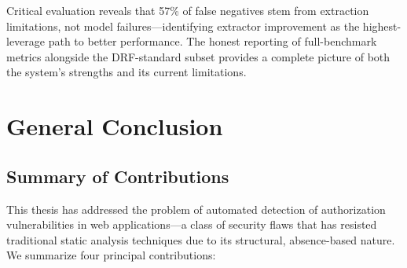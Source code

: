 Critical evaluation reveals that 57\% of false negatives stem from extraction limitations, not model failures—identifying extractor improvement as the highest-leverage path to better performance. The honest reporting of full-benchmark metrics alongside the DRF-standard subset provides a complete picture of both the system's strengths and its current limitations.



\chapter*{General Conclusion}
\label{ch:conclusion}

\section*{Summary of Contributions}

This thesis has addressed the problem of automated detection of authorization vulnerabilities in web applications—a class of security flaws that has resisted traditional static analysis techniques due to its structural, absence-based nature. We summarize four principal contributions:

